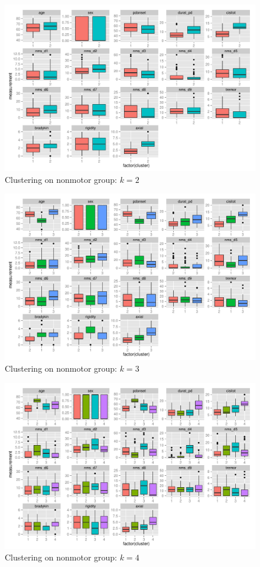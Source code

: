 \documentclass[letterpaper,12pt]{article}
\begin{document}
\begin{figure}[h]
  \centering
  \includegraphics[width=\linewidth]{c1-summaries-2.pdf}
  \caption{Clustering on nonmotor group: $k = 2$}
  \label{fig:c1-summaries-2}
\end{figure}
\begin{figure}[h]
  \centering
  \includegraphics[width=\linewidth]{c1-summaries-3.pdf}
  \caption{Clustering on nonmotor group: $k = 3$}
  \label{fig:c1-summaries-3}
\end{figure}
\begin{figure}[h]
  \centering
  \includegraphics[width=\linewidth]{c1-summaries-4.pdf}
  \caption{Clustering on nonmotor group: $k = 4$}
  \label{fig:c1-summaries-4}
\end{figure}
\end{document}
